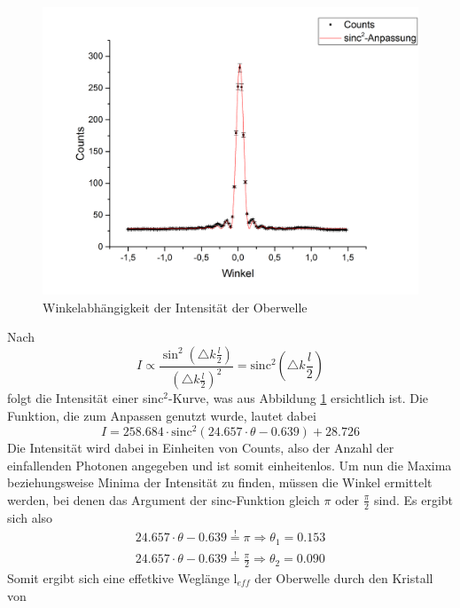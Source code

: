 \begin{figure}[H]
	\begin{center}
		\includegraphics[scale=.5]{Bilder/Winkel.png}
		\caption{Winkelabhängigkeit der Intensität der Oberwelle}
		\label{winkel}
	\end{center}
\end{figure}
Nach 
\begin{equation}
I\propto \frac{\sin^2\left(\triangle k \frac{l}{2}\right)}{\left(\triangle k \frac{l}{2}\right)^2}=\text{sinc}^2\left(\triangle k \frac{l}{2}\right)
\label{sinc}
\end{equation}
folgt die Intensität einer sinc$^2$-Kurve, was aus Abbildung \ref{winkel} ersichtlich ist. Die Funktion, die zum Anpassen genutzt wurde, lautet dabei
\begin{equation}
I=258.684\cdot\text{sinc}^2\left(24.657\cdot\theta-0.639\right)+28.726
\end{equation}
Die Intensität wird dabei in Einheiten von Counts, also der Anzahl der einfallenden Photonen angegeben und ist somit einheitenlos. \newline
Um nun die Maxima beziehungsweise Minima der Intensität zu finden, müssen die Winkel ermittelt werden, bei denen das Argument der sinc-Funktion gleich $\pi$ oder $\frac{\pi}{2}$ sind. Es ergibt sich also
\begin{eqnarray}
24.657\cdot\theta-0.639\overset{!}{=}\pi\Longrightarrow\theta_1=0.153\\
24.657\cdot\theta-0.639\overset{!}{=}\frac{\pi}{2}\Longrightarrow\theta_2=0.090
\end{eqnarray}
Somit ergibt sich eine effetkive Weglänge l$_{eff}$ der Oberwelle durch den Kristall von 
